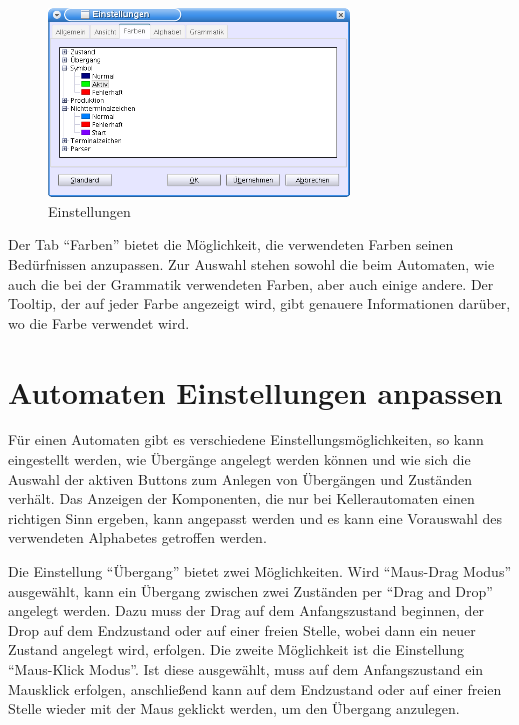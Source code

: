\begin{figure}[h]
\begin{center}
\includegraphics[width=8cm]{../images/preferences.png}
\caption{Einstellungen}
\end{center}
\end{figure}

Der Tab "`Farben"' bietet die Möglichkeit, die verwendeten Farben seinen
Be\-dürf\-nis\-sen anzupassen. Zur Auswahl stehen sowohl die beim Automaten, wie
auch die bei der Grammatik verwendeten Farben, aber auch einige andere. Der
Tooltip, der auf jeder Farbe angezeigt wird, gibt genauere Informationen
darüber, wo die Farbe verwendet wird.


\section{Automaten Einstellungen anpassen}

Für einen Automaten gibt es verschiedene Einstellungsmöglichkeiten, so kann
eingestellt werden, wie Übergänge angelegt werden können und wie sich die
Auswahl der aktiven Buttons zum Anlegen von Übergängen und Zuständen verhält.
Das Anzeigen der Komponenten, die nur bei Kellerautomaten einen richtigen Sinn
ergeben, kann angepasst werden und es kann eine Vorauswahl des verwendeten
Alphabetes getroffen werden.\vspace{10pt}

Die Einstellung "`Übergang"' bietet zwei Möglichkeiten. Wird "`Maus-Drag Modus"'
ausgewählt, kann ein Übergang zwischen zwei Zuständen per "`Drag and Drop"'
angelegt werden. Dazu muss der Drag auf dem Anfangszustand beginnen, der Drop auf
dem Endzustand oder auf einer freien Stelle, wobei dann ein neuer Zustand
angelegt wird, erfolgen. Die zweite Möglichkeit ist die Einstellung "`Maus-Klick
Modus"'. Ist diese ausgewählt, muss auf dem Anfangszustand ein Mausklick
erfolgen, anschließend kann auf dem Endzustand oder auf einer freien Stelle
wieder mit der Maus geklickt werden, um den Übergang anzulegen.\vspace{10pt}

